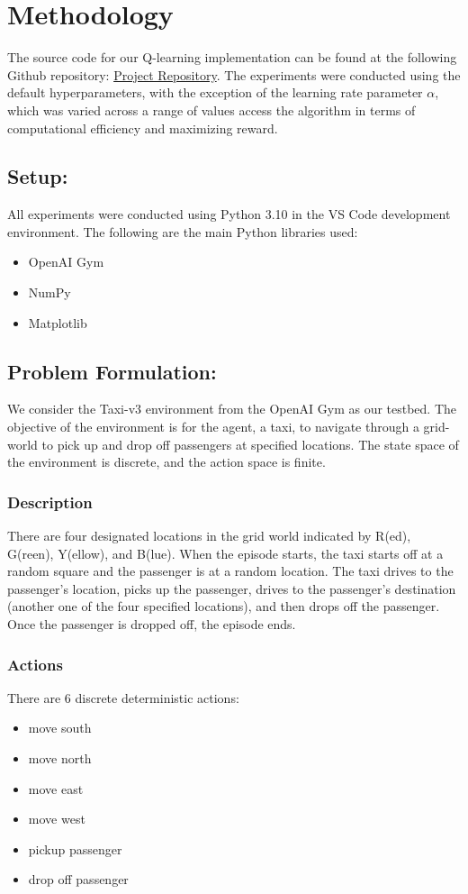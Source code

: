\documentclass[conference]{IEEEtran}
\begin{document}
\section{Methodology}
The source code for our Q-learning implementation can be found at the following Github repository: \href{https://github.com/haider-06418/RL-Project/tree/main}{Project Repository}. The experiments were conducted using the default hyperparameters, with the exception of the learning rate parameter $\alpha$, which was varied across a range of values access the algorithm in terms of computational efficiency and maximizing reward.

\subsection{Setup:}
All experiments were conducted using Python 3.10 in the VS Code development environment. The following are the main Python libraries used:
\begin{itemize}
\item OpenAI Gym
\item NumPy
\item Matplotlib
\end{itemize}

\subsection{Problem Formulation:}
We consider the Taxi-v3 environment from the OpenAI Gym as our testbed. The objective of the environment is for the agent, a taxi, to navigate through a grid-world to pick up and drop off passengers at specified locations. The state space of the environment is discrete, and the action space is finite.
\newline
\subsubsection{Description} 
There are four designated locations in the grid world indicated by R(ed), G(reen), Y(ellow), and B(lue). When the episode starts, the taxi starts off at a random square and the passenger is at a random location. The taxi drives to the passenger's location, picks up the passenger, drives to the passenger's destination (another one of the four specified locations), and then drops off the passenger. Once the passenger is dropped off, the episode ends.
\newline
\subsubsection{Actions}
There are 6 discrete deterministic actions:
\begin{itemize}
    \item move south
    \item move north
    \item move east
    \item move west
    \item pickup passenger
    \item drop off passenger
    \newline
\end{itemize}
\end{document}
